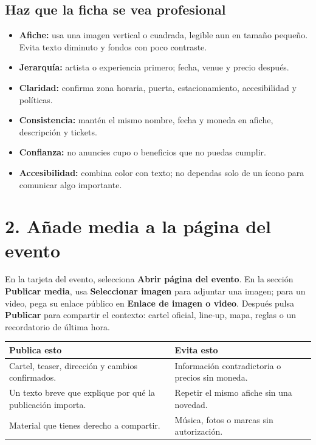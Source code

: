 \documentclass[10.5pt,letterpaper]{article}
\begin{document}
\subsection*{Haz que la ficha se vea profesional}
\begin{multicols}{2}
\begin{itemize}[leftmargin=15pt,itemsep=3pt]
\item \textbf{Afiche:} usa una imagen vertical o cuadrada, legible aun en tamaño pequeño. Evita texto diminuto y fondos con poco contraste.
\item \textbf{Jerarquía:} artista o experiencia primero; fecha, venue y precio después.
\item \textbf{Claridad:} confirma zona horaria, puerta, estacionamiento, accesibilidad y políticas.
\end{itemize}
\columnbreak
\begin{itemize}[leftmargin=15pt,itemsep=3pt]
\item \textbf{Consistencia:} mantén el mismo nombre, fecha y moneda en afiche, descripción y tickets.
\item \textbf{Confianza:} no anuncies cupo o beneficios que no puedas cumplir.
\item \textbf{Accesibilidad:} combina color con texto; no dependas solo de un ícono para comunicar algo importante.
\end{itemize}
\end{multicols}

\section*{2. Añade media a la página del evento}
\begin{tcolorbox}[enhanced,breakable,colback=white,colframe=TDFLine,boxrule=.8pt,arc=10pt,left=14pt,right=14pt,top=11pt,bottom=11pt]
En la tarjeta del evento, selecciona \textbf{Abrir página del evento}. En la sección \textbf{Publicar media}, usa \textbf{Seleccionar imagen} para adjuntar una imagen; para un video, pega su enlace público en \textbf{Enlace de imagen o video}. Después pulsa \textbf{Publicar} para compartir el contexto: cartel oficial, line-up, mapa, reglas o un recordatorio de última hora.
\end{tcolorbox}

\begin{tabularx}{\textwidth}{@{}Y Y@{}}
\textcolor{TDFViolet}{\bfseries Publica esto} & \textcolor{TDFViolet}{\bfseries Evita esto} \\
\toprule
Cartel, teaser, dirección y cambios confirmados. & Información contradictoria o precios sin moneda. \\
Un texto breve que explique por qué la publicación importa. & Repetir el mismo afiche sin una novedad. \\
Material que tienes derecho a compartir. & Música, fotos o marcas sin autorización. \\
\bottomrule
\end{tabularx}
\end{document}
